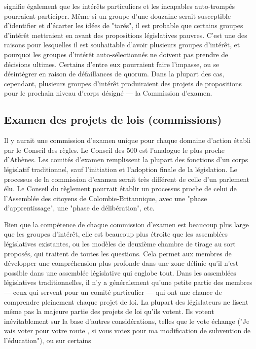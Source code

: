 signifie également que les intérêts particuliers et les incapables
auto-trompés pourraient participer. Même si un groupe d'une douzaine
serait susceptible d'identifier et d'écarter les idées de "tarés", il
est probable que certains groupes d'intérêt mettraient en avant des
propositions législatives pauvres. C'est une des raisons pour
lesquelles il est souhaitable d'avoir plusieurs groupes d'intérêt, et
pourquoi les groupes d'intérêt auto-sélectionnés ne doivent pas prendre
de décisions ultimes. Certains d'entre eux pourraient faire l'impasse,
ou se désintégrer en raison de défaillances de quorum. Dans la plupart
des cas, cependant, plusieurs groupes d'intérêt produiraient des
projets de propositions pour le prochain niveau d'corps désigné --- la
Commission d'examen.\par
\subsection{Examen des projets de lois (commissions)}
Il y aurait une commission d'examen unique pour chaque domaine
d'action établi par le Conseil des règles. Le Conseil des 500 est
l'analogue le plus proche d'Athènes. Les comités d'examen remplissent
la plupart des fonctions d'un corps législatif traditionnel, sauf
l'initiation et l'adoption finale de la législation. Le processus de
la commission d'examen serait très différent de celle d'un parlement
élu. Le Conseil du règlement pourrait établir un processus proche de
celui de l'Assemblée des citoyens de Colombie-Britannique, avec une
"phase d'apprentissage", une "phase de délibération", etc. \par
Bien que la compétence de chaque commission d'examen est beaucoup plus
large que les groupes d'intérêt, elle est beaucoup plus étroite que les
assemblées législatives existantes, ou les modèles de deuxième chambre
de tirage au sort proposés, qui traitent de toutes les questions. Cela
permet aux membres de développer une compréhension plus profonde dans
une zone définie qu'il n'est possible dans une assemblée législative qui
englobe tout. Dans les assemblées législatives traditionnelles, il n'y a
généralement qu'une petite partie des membres --- ceux qui servent pour
un comité particulier --- qui ont une chance de comprendre pleinement
chaque projet de loi. La plupart des législateurs ne lisent même pas
la majeure partie des projets de loi qu'ils votent. Ils votent
inévitablement sur la base d'autres considérations, telles que le vote
échange ("Je vais voter pour votre route , si vous votez pour ma
modification de subvention de l'éducation"), ou sur certains 
